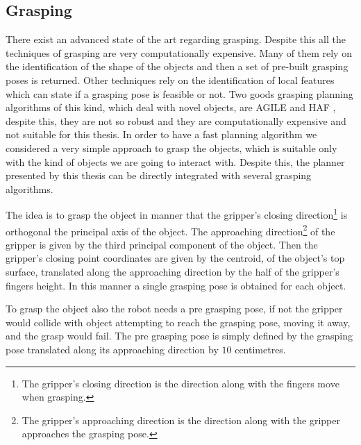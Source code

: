 
\subsection{Grasping}
\label{sec:grasping}

There exist an advanced state of the art regarding grasping. Despite this all the techniques of grasping are very computationally expensive. Many of them rely on the identification of the shape of the objects and then a set of pre-built grasping poses is returned\citep{brook2011collaborative}. Other techniques rely on the identification of local features which can state if a grasping pose is feasible or not. Two goods grasping planning algorithms of this kind, which deal with novel objects, are AGILE \citep{AGILE} and HAF \citep{haf}, despite this, they are not so robust and they are computationally expensive and not suitable for this thesis\citep{covallero}. In order to have a fast planning algorithm we considered a very simple approach to grasp the objects, which is suitable only with the kind of objects we are going to interact with. Despite this, the planner presented by this thesis can be directly integrated with several grasping algorithms. 

The idea is to grasp the object in manner that the gripper's closing direction\footnote{The gripper's closing direction is the direction along with the fingers move when grasping.} is orthogonal the principal axis of the object. The approaching direction\footnote{The gripper's approaching direction is the direction along with the gripper approaches the grasping pose.} of the gripper is given by the third principal component of the object. Then the gripper's closing point coordinates are given by the centroid, of the object's top surface, translated along the approaching direction by the half of the gripper's fingers height.
In this manner a single grasping pose is obtained for each object. 

To grasp the object also the robot needs a pre grasping pose, if not the gripper would collide with object attempting to reach the grasping pose, moving it away, and the grasp would fail. The pre grasping pose is simply defined by the grasping pose translated along its approaching direction by $10$ centimetres.

